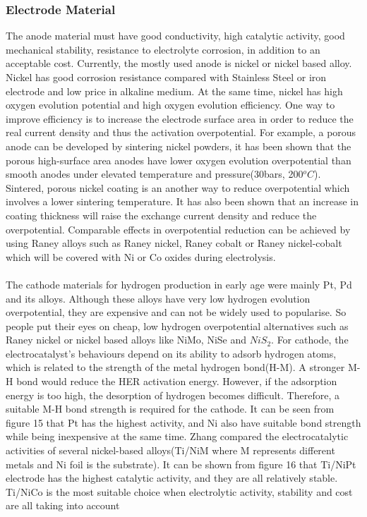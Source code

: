 \subsubsection{Electrode Material} 
The anode material must have good conductivity, high catalytic activity, good mechanical stability, resistance to electrolyte corrosion, in addition to an acceptable cost. Currently, the mostly used anode is nickel or nickel based alloy. Nickel has good corrosion resistance compared with Stainless Steel or iron electrode and low price in alkaline medium. At the same time, nickel has high oxygen evolution potential and high oxygen evolution efficiency. One way to improve efficiency is to increase the electrode surface area in order to reduce the real current density and thus the activation overpotential. For example, a porous anode can be developed by sintering nickel powders, it has been shown that the porous high-surface area anodes have lower oxygen evolution overpotential than smooth anodes under elevated temperature and pressure(30bars, 200$^oC$). Sintered, porous nickel coating is an another way to reduce overpotential which involves a lower sintering temperature. It has also been shown that an increase in coating thickness will raise the exchange current density and reduce the overpotential. Comparable effects in overpotential reduction can be achieved by using Raney alloys such as Raney nickel, Raney cobalt or Raney nickel-cobalt which will be covered with Ni or Co oxides during electrolysis.\cite{anode} \cite{anode2}\\ \\
The cathode materials for hydrogen production in early age were mainly Pt, Pd and its alloys. Although these alloys have very low hydrogen evolution overpotential, they are expensive and can not be widely used to popularise.  So people put their eyes on cheap, low hydrogen overpotential alternatives such as Raney nickel or nickel based alloys like NiMo, NiSe and $NiS_2$. For cathode, the electrocatalyst's behaviours depend on its ability to adsorb hydrogen atoms, which is related to the strength of the metal hydrogen bond(H-M). A stronger M-H bond would reduce the HER activation energy. However, if the adsorption energy is too high, the desorption of hydrogen becomes difficult. Therefore, a suitable M-H bond strength is required for the cathode. It can be seen from figure 15 that Pt has the highest activity, and Ni also have suitable bond strength while being inexpensive at the same time. \cite{cathode2} Zhang compared the electrocatalytic activities of several nickel-based alloys(Ti/NiM where M represents different metals and Ni foil is the substrate). It can be shown from figure 16 that Ti/NiPt electrode has the highest catalytic activity, and they are all relatively stable. Ti/NiCo is the most suitable choice when electrolytic activity, stability and cost are all taking into account\cite{cathode}
